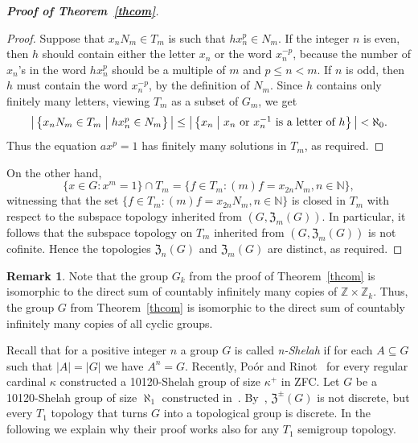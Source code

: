 \documentclass[11pt]{amsart}
\makeatletter
\newtheorem{theorem}{Theorem}[section]
\theoremstyle{definition}
\newtheorem{remark}[theorem]{Remark}
\newcommand{\makeset}[2]{\left\lbrace #1 \;\middle|\;
 \begin{tabular}{@{}l@{}}
   #2
  \end{tabular}
  \right\rbrace}
\makeatother
\begin{document}
\begin{proof}[{\bf Proof of Theorem~\ref{thcom}}]
\begin{proof}
Suppose that \(x_nN_m\in T_m\) is such that $hx_n^p\in N_m$. If the integer $n$ is even, then $h$ should contain either the letter $x_n$ or the word $x_n^{-p}$, because the number of $x_n$'s in the word $hx_n^p$ should be a multiple of $m$ and $p\leq n<m$. If \(n\) is odd, then \(h\) must contain the word \(x_n^{-p}\), by the definition of $N_m$.
Since $h$ contains only finitely many letters, viewing \(T_m\) as a subset of \(G_m\), we get
\[\big|\makeset{x_nN_m\in T_m}{\(hx_{n}^p\in N_m\)}\big|\leq \big|\makeset{x_n}{\(x_n\) or $x_n^{-1}$ is a letter of \(h\)}\big|<\aleph_0 .\] 
Thus the equation $ax^p=1$ has finitely many solutions in \(T_m\), as required. 
\end{proof}
On the other hand, 
$$\{x\in G:x^m=1\}\cap T_m= \{f\in T_m: (m)f=x_{2n}N_m, n\in\mathbb N\},$$ 
witnessing that the set $\{f\in T_m: (m)f=x_{2n}N_m, n\in\mathbb N\}$ is closed in $T_m$ with respect to the subspace topology inherited from $(G,\mathfrak{Z}_{m}(G))$. In particular, it follows that the subspace topology on $T_m$ inherited from $(G,\mathfrak{Z}_{m}(G))$ is not cofinite.
Hence the topologies $\mathfrak{Z}_{n}(G)$ and $\mathfrak{Z}_{m}(G)$ are distinct, as required. 
\end{proof}



\begin{remark}
Note that the group \(G_k\) from the proof of Theorem~\ref{thcom} is isomorphic to the direct sum of countably infinitely many copies of $\mathbb{Z}\times \mathbb{Z}_{k}$. Thus,
the group $G$ from Theorem~\ref{thcom} is isomorphic to the direct sum of countably infinitely many copies of all cyclic groups.
\end{remark}






Recall that for a positive integer $n$ a group $G$ is called {\em n-Shelah} if for each $A\subseteq G$ such that $|A|=|G|$ we have $A^n=G$.
Recently, Poór and Rinot~\cite{PR} for every regular cardinal $\kappa$ constructed a 10120-Shelah group of size $\kappa^+$ in ZFC. 
Let $G$ be a 10120-Shelah group of size $\aleph_1$ constructed in~\cite{PR}. By~\cite[Lemma 5.11]{PR}, $\mathfrak{Z}^{\pm}(G)$ is not discrete, but every $T_1$ topology that turns $G$ into a topological group is discrete. In the following we explain why their proof works also for any $T_1$ semigroup topology. %

 
\end{document}
